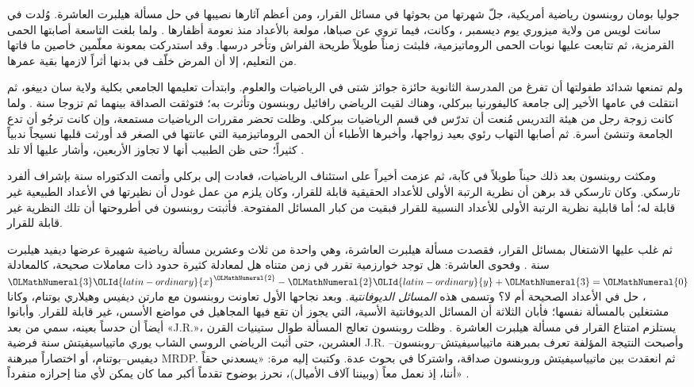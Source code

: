 \documentclass[../../../include/open-logic-section]{subfiles}
\begin{document}



جوليا بومان روبنسون رياضية أمريكية، جلّ شهرتها من بحوثها في مسائل القرار،
ومن أعظم آثارها نصيبها في حل مسألة هيلبرت العاشرة. وُلدت في سانت لويس من
ولاية ميزوري يوم  ديسمبر ، وكانت، فيما تروي عن صباها، مولعة بالأعداد
منذ نعومة أظفارها \citep[4]{Reid1986}. ولما بلغت التاسعة أصابتها الحمى
القرمزية، ثم تتابعت عليها نوبات الحمى الروماتيزمية، فلبثت زمناً طويلاً
طريحة الفراش وتأخر درسها. وقد استدركت بمعونة معلّمين خاصين ما فاتها من
التعليم، إلا أن المرض خلّف في بدنها أثراً لازمها بقية عمرها.

ولم تمنعها شدائد طفولتها أن تفرغ من المدرسة الثانوية حائزة جوائز شتى في
الرياضيات والعلوم. وابتدأت تعليمها الجامعي بكلية ولاية سان دييغو، ثم
انتقلت في عامها الأخير إلى جامعة كاليفورنيا ببركلي، وهناك لقيت الرياضي
رافائيل روبنسون وتأثرت به؛ فتوثقت الصداقة بينهما ثم تزوجا سنة . ولما
كانت زوجة رجل من هيئة التدريس مُنعت أن تدرّس في قسم الرياضيات ببركلي.
وظلت تحضر مقررات الرياضيات مستمعة، وإن كانت ترجُو أن تدع الجامعة وتنشئ
أسرة. ثم أصابها التهاب رئوي بعيد زواجها، وأخبرها الأطباء أن الحمى
الروماتيزمية التي عانتها في الصغر قد أورثت قلبها نسيجاً ندبياً كثيراً؛
حتى ظن الطبيب أنها لا تجاوز الأربعين، وأشار عليها ألا تلد
\citep[13]{Reid1986}.

ومكثت روبنسون بعد ذلك حيناً طويلاً في كآبة، ثم عزمت أخيراً على استئناف
الرياضيات، فعادت إلى بركلي وأتمت الدكتوراه سنة  بإشراف ألفرد تارسكي.
وكان تارسكي قد برهن أن نظرية الرتبة الأولى للأعداد الحقيقية قابلة للقرار،
وكان يلزم من عمل غودل أن نظيرتها في الأعداد الطبيعية غير قابلة له؛ أما
قابلية نظرية الرتبة الأولى للأعداد النسبية للقرار فبقيت من كبار المسائل
المفتوحة. فأثبتت روبنسون في أطروحتها \citeyearpar{Robinson1949} أن تلك
النظرية غير قابلة للقرار.

ثم غلب عليها الاشتغال بمسائل القرار، فقصدت مسألة هيلبرت العاشرة، وهي واحدة
من ثلاث وعشرين مسألة رياضية شهيرة عرضها ديفيد هيلبرت سنة . وفحوى
العاشرة: هل توجد خوارزمية تقرر في زمن متناه هل لمعادلة كثيرة حدود ذات معاملات
صحيحة، كالمعادلة ${\OLMathNumeral{3}}{\OLId{latin-ordinary}{x}}^{\OLMathNumeral{2}} - {\OLMathNumeral{2}}{\OLId{latin-ordinary}{y}} +{\OLMathNumeral{3}} = {\OLMathNumeral{0}}$، حل في الأعداد الصحيحة أم لا؟ وتسمى
هذه \emph{المسائل الديوفانتية}. وبعد نجاحها الأول تعاونت روبنسون مع مارتن
ديفيس وهيلاري بوتنام، وكانا مشتغلين بالمسألة نفسها؛ فأبان الثلاثة أن
المسائل الديوفانتية الأسية، التي يجوز أن تقع فيها المجاهيل في مواضع
الأسس، غير قابلة للقرار. وأبانوا أيضاً أن حدساً بعينه، سمي من بعد «J.R.»،
يستلزم امتناع القرار في مسألة هيلبرت العاشرة
\citep{DavisPutnamRobinson1961}. وظلت روبنسون تعالج المسألة طوال ستينيات
القرن العشرين، حتى أثبت الرياضي الروسي الشاب يوري ماتيياسيفيتش سنة 
فرضية J.R. وأصبحت النتيجة المؤلفة تعرف بمبرهنة
ماتيياسيفيتش--روبنسون--ديفيس--بوتنام، أو اختصاراً مبرهنة MRDP. ثم انعقدت
بين ماتيياسيفيتش وروبنسون صداقة، واشتركا في بحوث عدة. وكتبت إليه مرة:
«يسعدني حقاً أننا، إذ نعمل معاً (وبيننا آلاف الأميال)، نحرز بوضوح تقدماً
أكبر مما كان يمكن لأي منا إحرازه منفرداً» \citep[45]{Matijasevich1992}.
\end{document}
